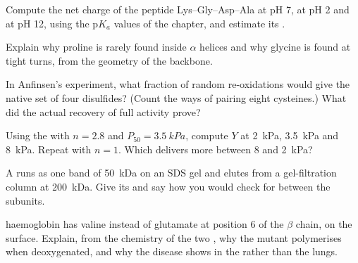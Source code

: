 \begin{exercise}[$\star\star$]\label{exo:b1:proteins:5}
Compute the net charge of the peptide Lys--Gly--Asp--Ala at pH 7, at
pH 2 and at pH 12, using the p$K_a$ values of the chapter, and estimate
its .
\end{exercise}

\begin{exercise}[$\star\star$]\label{exo:b1:proteins:6}
Explain why proline is rarely found inside $\alpha$ helices and why
glycine is found at tight turns, from the geometry of the backbone.
\end{exercise}

\begin{exercise}[$\star\star$]\label{exo:b1:proteins:7}
In Anfinsen's experiment, what fraction of random re-oxidations would
give the native set of four disulfides? (Count the ways of pairing
eight cysteines.) What did the actual recovery of full activity
prove?
\end{exercise}

\begin{exercise}[$\star\star$]\label{exo:b1:proteins:8}
Using the  with $n = 2.8$ and $P_{50} = \qty{3.5}{kPa}$,
compute $Y$ at \qty{2}{kPa}, \qty{3.5}{kPa} and \qty{8}{kPa}. Repeat
with $n = 1$. Which  delivers more between \qty{8}{} and
\qty{2}{kPa}?
\end{exercise}

\begin{exercise}[$\star\star$]\label{exo:b1:proteins:9}
A  runs as one band of \qty{50}{kDa} on an SDS gel and elutes
from a gel-filtration column at \qty{200}{kDa}. Give its  and say how you would check for  between
the subunits.
\end{exercise}

\begin{exercise}[$\star\star\star$]\label{exo:b1:proteins:10}
 haemoglobin has valine instead of glutamate at position 6
of the $\beta$ chain, on the surface. Explain, from the chemistry of
the two , why the mutant  polymerises when
deoxygenated, and why the disease shows in the  rather than the
lungs.
\end{exercise}

